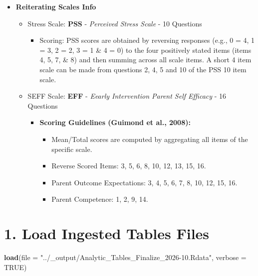 \documentclass[
]{article}
\newenvironment{Shaded}{\begin{snugshade}}{\end{snugshade}}
\newcommand{\AttributeTok}[1]{\textcolor[rgb]{0.13,0.29,0.53}{#1}}
\newcommand{\ConstantTok}[1]{\textcolor[rgb]{0.56,0.35,0.01}{#1}}
\newcommand{\FunctionTok}[1]{\textcolor[rgb]{0.13,0.29,0.53}{\textbf{#1}}}
\newcommand{\NormalTok}[1]{#1}
\newcommand{\StringTok}[1]{\textcolor[rgb]{0.31,0.60,0.02}{#1}}
\providecommand{\tightlist}{%
  \setlength{\itemsep}{0pt}\setlength{\parskip}{0pt}}
\begin{document}
\begin{itemize}
\tightlist
\item
  \textbf{Reiterating Scales Info}

  \begin{itemize}
  \tightlist
  \item
    Stress Scale: \textbf{PSS} - \emph{Perceived Stress Scale} - 10
    Questions

    \begin{itemize}
    \tightlist
    \item
      Scoring: PSS scores are obtained by reversing responses (e.g., 0 =
      4, 1 = 3, 2 = 2, 3 = 1 \& 4 = 0) to the four positively stated
      items (items 4, 5, 7, \& 8) and then summing across all scale
      items. A short 4 item scale can be made from questions 2, 4, 5 and
      10 of the PSS 10 item scale.
    \end{itemize}
  \item
    SEFF Scale: \textbf{EFF} - \emph{Eearly Intervention Parent Self
    Efficacy} - 16 Questions

    \begin{itemize}
    \tightlist
    \item
      \textbf{Scoring Guidelines (Guimond et al., 2008):}

      \begin{itemize}
      \tightlist
      \item
        Mean/Total scores are computed by aggregating all items of the
        specific scale.
      \item
        Reverse Scored Items: 3, 5, 6, 8, 10, 12, 13, 15, 16.
      \item
        Parent Outcome Expectations: 3, 4, 5, 6, 7, 8, 10, 12, 15, 16.
      \item
        Parent Competence: 1, 2, 9, 14.
      \end{itemize}
    \end{itemize}
  \end{itemize}
\end{itemize}

\section{1. Load Ingested Tables
Files}\label{load-ingested-tables-files}

\begin{Shaded}
\begin{Highlighting}[]
\FunctionTok{load}\NormalTok{(}\AttributeTok{file =} \StringTok{"../\_output/Analytic\_Tables\_Finalize\_2026{-}10.Rdata"}\NormalTok{, }\AttributeTok{verbose =} \ConstantTok{TRUE}\NormalTok{)}
\end{Highlighting}
\end{Shaded}
\end{document}
